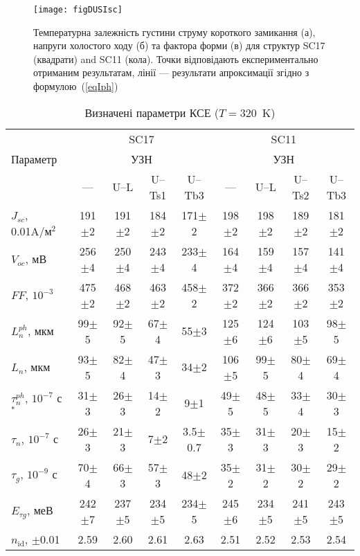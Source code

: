 \begin{figure}
\center
\texttt{[image: figDUSIsc]}%
\caption{\label{figDUSIsc}
Температурна залежність густини струму короткого замикання (а),
напруги холостого ходу (б) та
фактора форми (в)
для структур SC17 (квадрати) and SC11 (кола).
\FigCaptionSSC
Точки відповідають експериментально отриманим результатам,
лінії --- результати апроксимації згідно з формулою~(\ref{eqIph})
}%
\end{figure}


\begin{table}
\caption{\label{tabSSCParam}Визначені параметри КСЕ ($T=320$~K)
}
\small
\begin{tabular}{|l|c|c|c|c|c|c|c|c|}
\hline
&\multicolumn{4}{c|}{SC17}&\multicolumn{4}{|c|}{SC11}\\
Параметр&\multicolumn{4}{c|}{УЗН}&\multicolumn{4}{|c|}{УЗН}\\ \cline{2-9}
&---&U--L&U--Ts1&U--Tb3&---&U--L&U--Ts2&U--Tb3\\
\hhline{|=========|}
$J_{sc}$, 0.01A/м$^2$&191$\pm$2&191$\pm$2&184$\pm$2&171$\pm$2&198$\pm$2&198$\pm$2&189$\pm$2&181$\pm$2\\ \hline
$V_{oc}$, мВ&256$\pm$4&250$\pm$4&243$\pm$4&233$\pm$4&164$\pm$4&159$\pm$4&157$\pm$4&141$\pm$4\\ \hline
$F\!F$, $10^{-3}$&475$\pm$2&468$\pm$2&463$\pm$2&458$\pm$2&372$\pm$2&366$\pm$2&366$\pm$2&353$\pm$2\\ \hline
$L_n^{ph}$, мкм&99$\pm$5&92$\pm$5&67$\pm$4&55$\pm$3&125$\pm$6&124$\pm$6&103$\pm$5&98$\pm$5\\ \hline
$L_n$, мкм&93$\pm$5&82$\pm$4&47$\pm$3&34$\pm$2&106$\pm$5&99$\pm$5&80$\pm$4&69$\pm$4\\ \hline
$\tau_n^{ph}$, $10^{-7}$ с$^*$&31$\pm$3&26$\pm$3&14$\pm$2&9$\pm$1&49$\pm$5&48$\pm$5&33$\pm$4&30$\pm$3\\ \hline
$\tau_n$, $10^{-7}$ с&26$\pm$3&21$\pm$3&7$\pm$2&3.5$\pm$0.7&35$\pm$3&31$\pm$3&20$\pm$3&15$\pm$2\\ \hline
$\tau_g$, $10^{-9}$ с&70$\pm$4&66$\pm$3&57$\pm$3&48$\pm$2&35$\pm$2&31$\pm$2&30$\pm$2&29$\pm$2\\ \hline
$E_{\tau g}$, меВ&242$\pm$7&237$\pm$5&234$\pm$5&234$\pm$5&245$\pm$6&234$\pm$5&241$\pm$5&243$\pm$5\\ \hline
$n_\mathrm{id}$, $\pm$0.01&2.59&2.60&2.61&2.63&2.51&2.52&2.53&2.54\\ \hline

\end{tabular}
\end{table}
